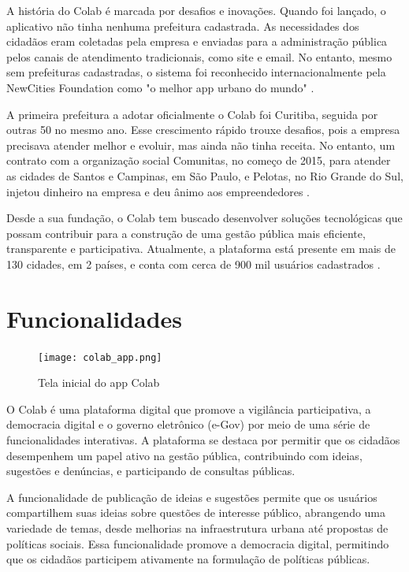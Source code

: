 A história do Colab é marcada por desafios e inovações. Quando foi lançado, o aplicativo não tinha nenhuma prefeitura cadastrada. As necessidades dos cidadãos eram coletadas pela empresa e enviadas para a administração pública pelos canais de atendimento tradicionais, como site e email. No entanto, mesmo sem prefeituras cadastradas, o sistema foi reconhecido internacionalmente pela NewCities Foundation como "o melhor app urbano do mundo" \cite{2023_Colab_PAGE}.

A primeira prefeitura a adotar oficialmente o Colab foi Curitiba, seguida por outras 50 no mesmo ano. Esse crescimento rápido trouxe desafios, pois a empresa precisava atender melhor e evoluir, mas ainda não tinha receita. No entanto, um contrato com a organização social Comunitas, no começo de 2015, para atender as cidades de Santos e Campinas, em São Paulo, e Pelotas, no Rio Grande do Sul, injetou dinheiro na empresa e deu ânimo aos empreendedores \cite{2023_Colab_PAGE}.

Desde a sua fundação, o Colab tem buscado desenvolver soluções tecnológicas que possam contribuir para a construção de uma gestão pública mais eficiente, transparente e participativa. Atualmente, a plataforma está presente em mais de 130 cidades, em 2 países, e conta com cerca de 900 mil usuários cadastrados \cite{2023_Colab_PAGE}.

\section*{Funcionalidades}

\begin{figure}[!htb]
	\caption{Tela inicial do app Colab}
	\label{fig:colab_app}
	\centering
	\texttt{[image: colab\_app.png]}
\end{figure}

O Colab é uma plataforma digital que promove a vigilância participativa, a democracia digital e o governo eletrônico (e-Gov) por meio de uma série de funcionalidades interativas. A plataforma se destaca por permitir que os cidadãos desempenhem um papel ativo na gestão pública, contribuindo com ideias, sugestões e denúncias, e participando de consultas públicas.

A funcionalidade de publicação de ideias e sugestões permite que os usuários compartilhem suas ideias sobre questões de interesse público, abrangendo uma variedade de temas, desde melhorias na infraestrutura urbana até propostas de políticas sociais. Essa funcionalidade promove a democracia digital, permitindo que os cidadãos participem ativamente na formulação de políticas públicas.

